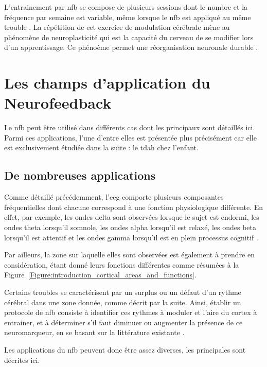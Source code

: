 L'entrainement par \gls{nfb} se compose de plusieurs sessions dont le nombre et la fréquence par semaine est variable, même lorsque le \gls{nfb} est appliqué au même trouble 
\citep{Enriquez2017}. La répétition de cet exercice de modulation cérébrale mène au phénomène de 
neuroplasticité \citep{VanDoren2017, Ros2010} qui est la capacité du cerveau de se modifier lors d'un apprentissage. Ce phénoème 
permet une réorganisation neuronale durable \citep{VanDoren2017}. 

\section{Les champs d'application du Neurofeedback} \label{applications_NFB}

Le \gls{nfb} peut être utilisé dans différents cas dont les principaux sont détaillés ici. Parmi ces applications, l'une d'entre elles est présentée 
plus précisément car elle est exclusivement étudiée dans la suite : le \gls{tdah} chez l'enfant.

\subsection{De nombreuses applications}

Comme détaillé précédemment, l'\gls{eeg} comporte plusieurs composantes fréquentielles dont chacune correspond à une fonction physiologique différente.
En effet, par exemple, les ondes delta sont observées lorsque le sujet est endormi, les ondes theta lorsqu'il somnole, les ondes alpha lorsqu'il est relaxé, 
les ondes beta lorsqu'il est attentif et les ondes gamma lorsqu'il est en plein processus cognitif \citep{Marzbani2016}. 

Par ailleurs, la zone sur laquelle elles sont observées est également à prendre en considération, étant donné leurs fonctions différentes comme résumées
à la Figure~\ref{Figure:introduction_cortical_areas_and_functions}.

Certains troubles se caractérisent par un surplus ou un défaut d'un rythme cérébral dans une zone donnée, comme décrit par la suite. 
Ainsi, établir un protocole de \gls{nfb} consiste à identifier ces rythmes à moduler et l'aire 
du cortex à entrainer, et à déterminer s'il faut diminuer ou augmenter la présence de ce neuromarqueur, en se basant sur la littérature 
existante \citep{Micoulaud2019}.

Les applications du \gls{nfb} peuvent donc être assez diverses, les principales sont décrites ici. 

